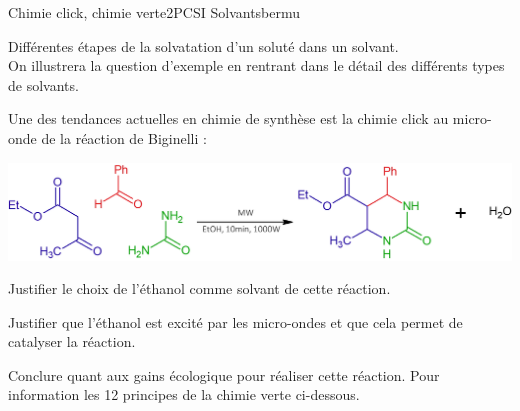
\begin{exercise}{Chimie click, chimie verte}{2}{PCSI}
{Solvants}{bermu}



\begin{questions}
    \questioncours Différentes étapes de la solvatation d'un soluté dans un solvant. \\
    On illustrera la question d'exemple en rentrant dans le détail des différents types de solvants.

\begin{EnvUplevel}

Une des tendances actuelles en chimie de synthèse est la chimie click au micro-onde de la réaction de Biginelli :
\begin{center}
    \includegraphics[width=.9\linewidth]{chimie/solvants/click.png}
\end{center}

\end{EnvUplevel}

    \question Justifier le choix de l'éthanol comme solvant de cette réaction.
    
    
    \question  Justifier que l'éthanol est excité par les micro-ondes et que cela permet de catalyser la réaction.
    
    
    \question Conclure quant aux gains écologique pour réaliser cette réaction. Pour information les 12 principes de la chimie verte ci-dessous.
    

\end{questions}
\end{exercise}
